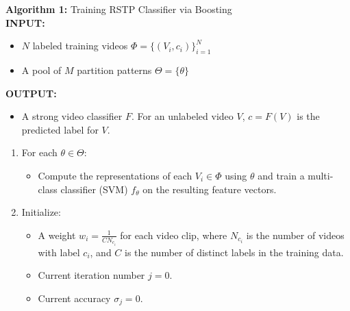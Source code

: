 \documentclass{bmvc2k}
\begin{document}
	\noindent\textbf{Algorithm 1:} Training RSTP Classifier via Boosting \\
	\textbf{INPUT:} 
	\begin{itemize}
		\item $N$ labeled training videos $\Phi = \{(V_i, c_i)\}_{i=1}^N$
		\item A pool of $M$ partition patterns $\Theta = \{\theta\}$
	\end{itemize}
	\textbf{OUTPUT:}
	\begin{itemize}
		\item A strong video classifier $F$. For an unlabeled video $V$, 
			$c=F(V)$ is the predicted label for $V$.
	\end{itemize}
			\begin{enumerate}

				\item For each $\theta \in \Theta$:
					\begin{itemize}
            \item Compute the representations of each $V_i \in \Phi$ using $\theta$
						and train a multi-class classifier (SVM) $f_\theta$ on the
            resulting feature vectors.
					\end{itemize}

				\item Initialize:
					\begin{itemize}
						\item A weight $w_i = \frac{1}{C N_{c_i}}$ for each video clip,
							where $N_{c_i}$ is the number of videos with label $c_i$,
              and $C$ is the number of distinct labels in the training data.
						\item Current iteration number $j=0$.
						\item Current accuracy $\sigma_j = 0$.
					\end{itemize}


\end{enumerate}
\end{document}
